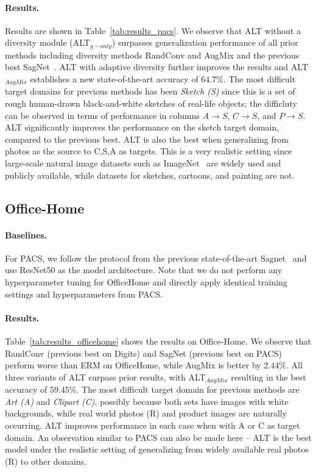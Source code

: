 \paragraph{Results.}
Results are shown in Table~\ref{tab:results_pacs}.
We observe that ALT without a diversity module (ALT$_{g-only}$) surpasses generalization performance of all prior methods including diversity methods RandConv and AugMix and the previous best SagNet~\citep{nam2021reducing}.
ALT with adaptive diversity further improves the results and ALT$_{AugMix}$ establishes a new state-of-the-art accuracy of $64.7\%$.
The most difficult target domains for previous methods has been \textit{Sketch (S)} since this is a set of rough human-drawn black-and-white sketches of real-life objects; the difficluty can be observed in terms of performance in columns $A{\rightarrow}S$, $C{\rightarrow}S$, and $P{\rightarrow}S$.
ALT significantly improves the performance on the sketch target domain, compared to the previous best.
ALT is also the best when generalizing from photos as the source to C,S,A as targets.
This is a very realistic setting since large-scale natural image datasets such as ImageNet~\citep{deng2009imagenet} are widely used and publicly available, while datasets for sketches, cartoons, and painting are not.


\subsection{Office-Home}
\paragraph{Baselines.}
For PACS, we follow the protocol from the previous state-of-the-art Sagnet~\citep{nam2021reducing} and use ResNet50 as the model architecture.
Note that we do not perform any hyperparameter tuning for OfficeHome and directly apply identical training settings and hyperparameters from PACS.

\paragraph{Results.}
Table~\ref{tab:results_officehome} shows the results on Office-Home.
We observe that RandConv (previous best on Digits) and SagNet (previous best on PACS) perform worse than ERM on OfficeHome, while AugMix is better by $2.44\%$.
All three variants of ALT surpass prior results, with ALT$_{AugMix}$ resulting in the best accuracy of $59.45\%$.
The most difficult target domain for previous methods are \textit{Art (A)} and \textit{Clipart (C)}, possibly because both sets have images with white backgrounds, while real world photos (R) and product images are naturally occurring.
ALT improves performance in each case when with A or C as target domain.
An observation similar to PACS can also be made here -- ALT is the best model under the realistic setting of generalizing from widely available real photos (R) to other domains.
